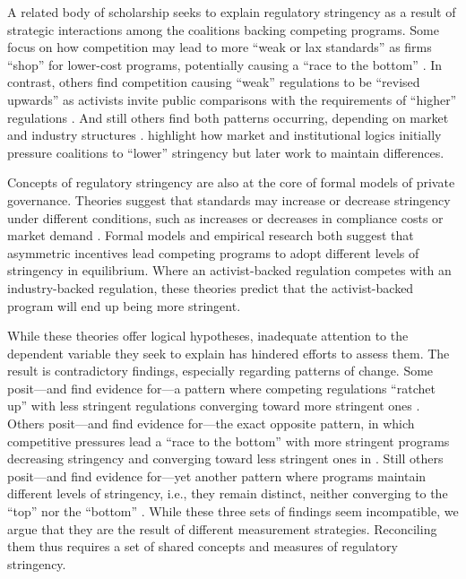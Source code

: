 \documentclass[
      12pt,
            Review ]{article}
\begin{document}
A related body of scholarship seeks to explain regulatory stringency as a result of strategic interactions among the coalitions backing competing programs. Some focus on how competition may lead to more ``weak or lax standards'' as firms ``shop'' for lower-cost programs, potentially causing a ``race to the bottom'' \citep{Abbott2010, Fransen2011, Gulbrandsen2004}. In contrast, others find competition causing ``weak'' regulations to be ``revised upwards'' as activists invite public comparisons with the requirements of ``higher'' regulations \citep{Overdevest2005, Overdevest2010}. And still others find both patterns occurring, depending on market and industry structures \citep{Cashore2004, Hassel2008, VanderVen2015}. \citet{Cashore2004} highlight how market and institutional logics initially pressure coalitions to ``lower'' stringency but later work to maintain differences.

Concepts of regulatory stringency are also at the core of formal models of private governance. Theories suggest that standards may increase or decrease stringency under different conditions, such as increases or decreases in compliance costs or market demand \citep{Abderrazak2009, Fischer2014}. Formal models \citep{Fischer2014, Li2015, Poret2016} and empirical research \citep{Cashore2004} both suggest that asymmetric incentives lead competing programs to adopt different levels of stringency in equilibrium. Where an activist-backed regulation competes with an industry-backed regulation, these theories predict that the activist-backed program will end up being more stringent.

While these theories offer logical hypotheses, inadequate attention to the dependent variable they seek to explain has hindered efforts to assess them. The result is contradictory findings, especially regarding patterns of change. Some posit---and find evidence for---a pattern where competing regulations ``ratchet up'' with less stringent regulations converging toward more stringent ones \citep{Overdevest2005, Overdevest2010, Overdevest2014}. Others posit---and find evidence for---the exact opposite pattern, in which competitive pressures lead a ``race to the bottom'' with more stringent programs decreasing stringency and converging toward less stringent ones in \citep{Abbott2010, Fransen2011, Gulbrandsen2004}. Still others posit---and find evidence for---yet another pattern where programs maintain different levels of stringency, i.e., they remain distinct, neither converging to the ``top'' nor the ``bottom'' \citep{Cashore2004}. While these three sets of findings seem incompatible, we argue that they are the result of different measurement strategies. Reconciling them thus requires a set of shared concepts and measures of regulatory stringency.
\end{document}
